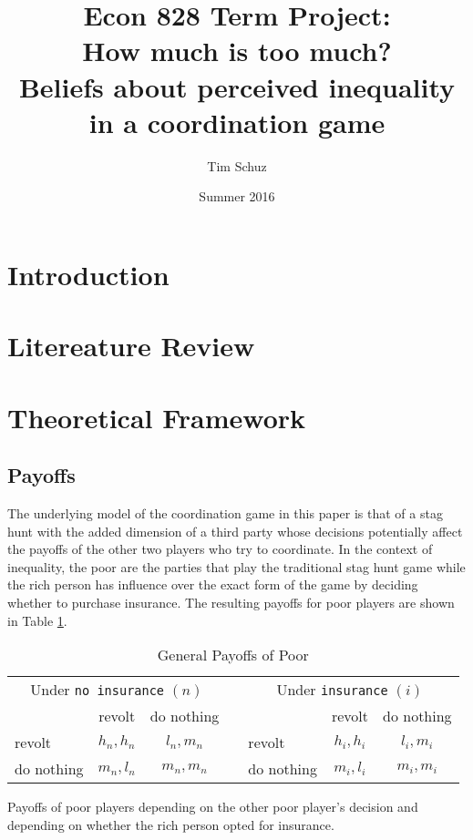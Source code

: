 \documentclass[12pt]{article}
\title{Econ 828 Term Project:\\ How much is too much?\\
		Beliefs about perceived inequality in a coordination game}
\author{Tim Schuz}
\date{Summer 2016}
\begin{document}
	\maketitle
	\section{Introduction}
	\section{Litereature Review}
	\section{Theoretical Framework}
	\subsection{Payoffs}
	The underlying model of the coordination game in this paper is that of a stag hunt with the added dimension of a third party whose decisions potentially affect the payoffs of the other two players who try to coordinate. In the context of inequality, the poor are the parties that play the traditional stag hunt game while the rich person has influence over the exact form of the game by deciding whether to purchase insurance. The resulting payoffs for poor players are shown in Table \ref{gpayoff}.
	
	\begin{table}[!htbp]
		\caption{General Payoffs of Poor}
		\label{gpayoff}
		\begin{center}
		\begin{tabular}{|l|c|c|c|l|c|c|}
			\multicolumn{3}{c}{Under \texttt{no insurance} $(n)$} &
			\multicolumn{1}{c}{} &
			\multicolumn{3}{c}{Under \texttt{insurance} $(i)$}\\
			\cline{1-3}\cline{5-7}
			& revolt & do nothing & & & revolt & do nothing\\
			\cline{1-3}\cline{5-7}
			revolt & $h_n, h_n$ & $l_n, m_n$ && revolt & $h_i, h_i$ & $l_i, m_i$\\
			\cline{1-3}\cline{5-7}
			do nothing & $m_n, l_n$ & $m_n, m_n$ && do nothing & $m_i, l_i$ & $m_i, m_i$\\
			\cline{1-3}\cline{5-7}
		\end{tabular}
		\end{center}
		\footnotesize
		Payoffs of poor players depending on the other poor player's decision and depending on whether the rich person opted for insurance. 
	\end{table}
	
\end{document}
